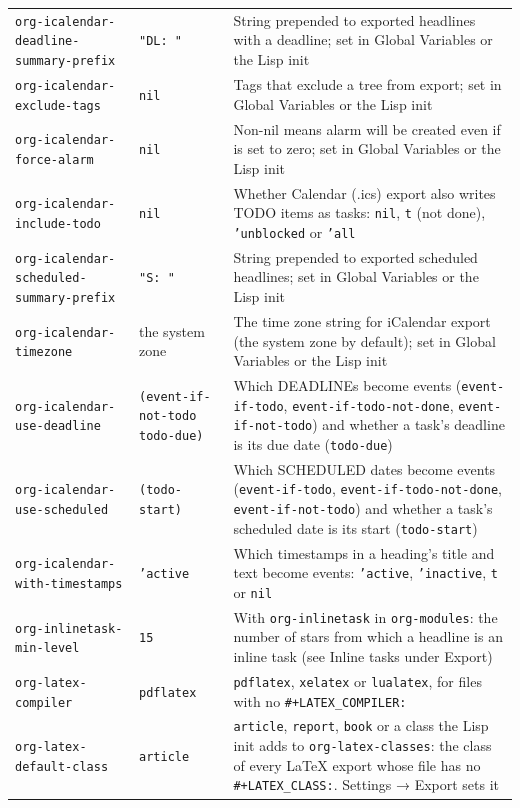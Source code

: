 \documentclass[11pt]{article}
\begin{document}
\begin{center}
\begin{tabular}{lll}
\texttt{org-icalendar-deadline-summary-prefix} & \texttt{"DL: "} & String prepended to exported headlines with a deadline; set in Global Variables or the Lisp init\\[0pt]
\texttt{org-icalendar-exclude-tags} & \texttt{nil} & Tags that exclude a tree from export; set in Global Variables or the Lisp init\\[0pt]
\texttt{org-icalendar-force-alarm} & \texttt{nil} & Non-nil means alarm will be created even if is set to zero; set in Global Variables or the Lisp init\\[0pt]
\texttt{org-icalendar-include-todo} & \texttt{nil} & Whether Calendar (.ics) export also writes TODO items as tasks: \texttt{nil}, \texttt{t} (not done), \texttt{'unblocked} or \texttt{'all}\\[0pt]
\texttt{org-icalendar-scheduled-summary-prefix} & \texttt{"S: "} & String prepended to exported scheduled headlines; set in Global Variables or the Lisp init\\[0pt]
\texttt{org-icalendar-timezone} & the system zone & The time zone string for iCalendar export (the system zone by default); set in Global Variables or the Lisp init\\[0pt]
\texttt{org-icalendar-use-deadline} & \texttt{(event-if-not-todo todo-due)} & Which DEADLINEs become events (\texttt{event-if-todo}, \texttt{event-if-todo-not-done}, \texttt{event-if-not-todo}) and whether a task's deadline is its due date (\texttt{todo-due})\\[0pt]
\texttt{org-icalendar-use-scheduled} & \texttt{(todo-start)} & Which SCHEDULED dates become events (\texttt{event-if-todo}, \texttt{event-if-todo-not-done}, \texttt{event-if-not-todo}) and whether a task's scheduled date is its start (\texttt{todo-start})\\[0pt]
\texttt{org-icalendar-with-timestamps} & \texttt{'active} & Which timestamps in a heading's title and text become events: \texttt{'active}, \texttt{'inactive}, \texttt{t} or \texttt{nil}\\[0pt]
\texttt{org-inlinetask-min-level} & \texttt{15} & With \texttt{org-inlinetask} in \texttt{org-modules}: the number of stars from which a headline is an inline task (see Inline tasks under Export)\\[0pt]
\texttt{org-latex-compiler} & \texttt{pdflatex} & \texttt{pdflatex}, \texttt{xelatex} or \texttt{lualatex}, for files with no \texttt{\#+LATEX\_COMPILER:}\\[0pt]
\texttt{org-latex-default-class} & \texttt{article} & \texttt{article}, \texttt{report}, \texttt{book} or a class the Lisp init adds to \texttt{org-latex-classes}: the class of every \LaTeX{} export whose file has no \texttt{\#+LATEX\_CLASS:}. Settings → Export sets it\\[0pt]

\end{tabular}
\end{center}
\end{document}

